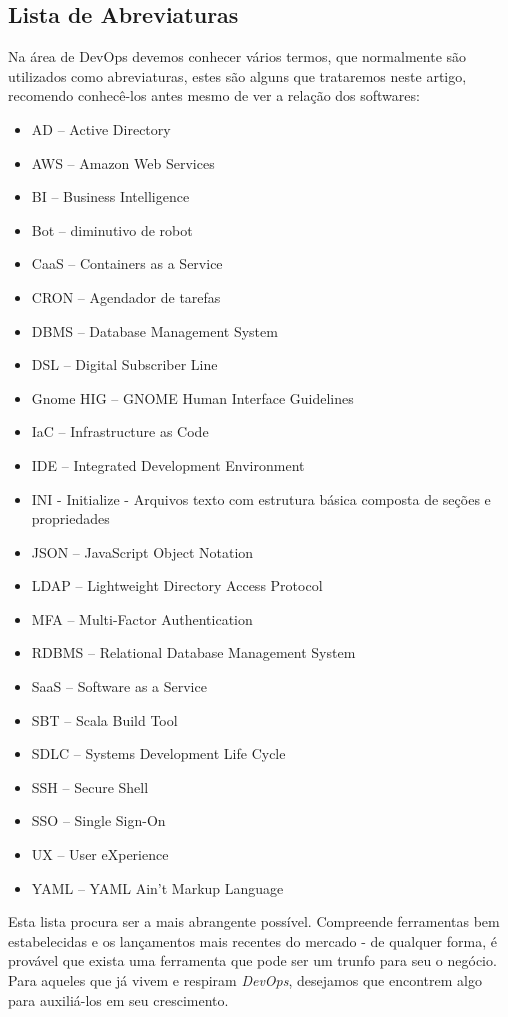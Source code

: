 \documentclass[fleqn,10pt]{SelfArx} %
\begin{document}
\subsection*{Lista de Abreviaturas}
Na área de DevOps devemos conhecer vários termos, que normalmente são utilizados como abreviaturas, estes são alguns que trataremos neste artigo, recomendo conhecê-los antes mesmo de ver a relação dos softwares: \begin{itemize}[nolistsep]
	\item AD -- Active Directory
	\item AWS -- Amazon Web Services
	\item BI -- Business Intelligence
	\item Bot -- diminutivo de robot
	\item CaaS -- Containers as a Service
	\item CRON -- Agendador de tarefas
	\item DBMS -- Database Management System
	\item DSL -- Digital Subscriber Line
	\item Gnome HIG -- GNOME Human Interface Guidelines
	\item IaC -- Infrastructure as Code
	\item IDE -- Integrated Development Environment
	\item INI - Initialize - Arquivos texto com estrutura básica composta de seções e propriedades
	\item JSON -- JavaScript Object Notation
	\item LDAP -- Lightweight Directory Access Protocol
	\item MFA -- Multi-Factor Authentication
	\item RDBMS -- Relational Database Management System
	\item SaaS -- Software as a Service
	\item SBT -- Scala Build Tool 
	\item SDLC -- Systems Development Life Cycle
	\item SSH -- Secure Shell
	\item SSO -- Single Sign-On
	\item UX -- User eXperience
	\item YAML -- YAML Ain't Markup Language
\end{itemize}

Esta lista procura ser a mais abrangente possível. Compreende ferramentas bem estabelecidas e os lançamentos mais recentes do mercado - de qualquer forma, é provável que exista uma ferramenta que pode ser um trunfo para seu o negócio. Para aqueles que já vivem e respiram \textit{DevOps}, desejamos que encontrem algo para auxiliá-los em seu crescimento.
\end{document}
